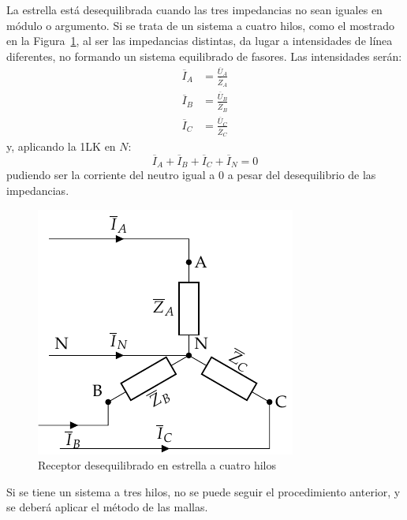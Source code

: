 	La estrella está desequilibrada cuando las tres impedancias no sean iguales en módulo o argumento. Si se trata de un sistema a cuatro hilos, como el mostrado en la Figura~\ref{fig.estrelladeseqiulibrado_4hilos}, al ser las impedancias distintas, da lugar a intensidades de línea diferentes, no formando un sistema equilibrado de fasores. Las intensidades serán: 
	\begin{align*}
      \overline{I}_A &= \frac{\overline{U}_A}{\overline{Z}_A}\\
      \overline{I}_B &= \frac{\overline{U}_B}{\overline{Z}_B}\\
      \overline{I}_C &= \frac{\overline{U}_C}{\overline{Z}_C}
    \end{align*}
    y, aplicando la 1LK en $N$:
    \begin{equation}
        \overline{I}_A  + \overline{I}_B + \overline{I}_C + \overline{I}_N = 0
    \end{equation}
	pudiendo ser la corriente del neutro igual a 0 a pesar del desequilibrio de las impedancias. 
	
	\begin{figure}[H]
	    \centering
	    \includegraphics{../figs/EstrellaDesequilibrado_Receptor.pdf}
	    \caption{Receptor desequilibrado en estrella a cuatro hilos}
	    \label{fig.estrelladeseqiulibrado_4hilos}
	\end{figure}
	
	Si se tiene un sistema a tres hilos, no se puede seguir el procedimiento anterior, y se deberá aplicar el método de las mallas. 

